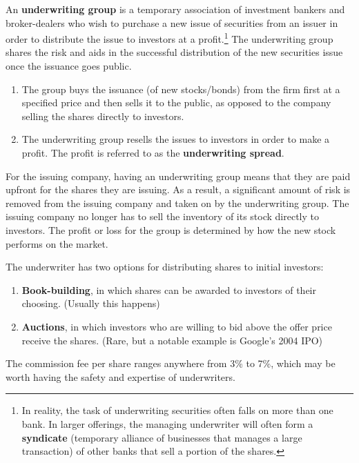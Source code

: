 \documentclass{article}
\begin{document}
    \begin{definition}[Underwriters]
      \label{def:underwriters}
      An \textbf{underwriting group} is a temporary association of investment bankers and broker-dealers who wish to purchase a new issue of securities from an issuer in order to distribute the issue to investors at a profit.\footnote{In reality, the task of underwriting securities often falls on more than one bank. In larger offerings, the managing underwriter will often form a \textbf{syndicate} (temporary alliance of businesses that manages a large transaction) of other banks that sell a portion of the shares. } The underwriting group shares the risk and aids in the successful distribution of the new securities issue once the issuance goes public. 
      \begin{enumerate}
        \item The group buys the issuance (of new stocks/bonds) from the firm first at a specified price and then sells it to the public, as opposed to the company selling the shares directly to investors. 
        \item The underwriting group resells the issues to investors in order to make a profit. The profit is referred to as the \textbf{underwriting spread}. 
      \end{enumerate}
      For the issuing company, having an underwriting group means that they are paid upfront for the shares they are issuing. As a result, a significant amount of risk is removed from the issuing company and taken on by the underwriting group. The issuing company no longer has to sell the inventory of its stock directly to investors. The profit or loss for the group is determined by how the new stock performs on the market. 

      The underwriter has two options for distributing shares to initial investors: 
      \begin{enumerate}
        \item \textbf{Book-building}, in which shares can be awarded to investors of their choosing. (Usually this happens) 
        \item \textbf{Auctions}, in which investors who are willing to bid above the offer price receive the shares. (Rare, but a notable example is Google's 2004 IPO)
      \end{enumerate}
      The commission fee per share ranges anywhere from 3\% to 7\%, which may be worth having the safety and expertise of underwriters. 
    \end{definition}
\end{document}

